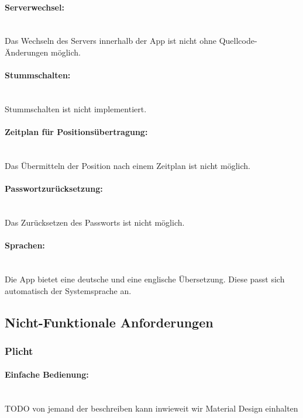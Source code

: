 \documentclass[parskip=full,11pt]{scrartcl}
\begin{document}
\paragraph{\small Serverwechsel:} \hspace{0pt} \\
Das Wechseln des Servers innerhalb der App ist nicht ohne Quellcode-Änderungen
möglich.

\paragraph{\small Stummschalten:} \hspace{0pt} \\
Stummschalten ist nicht implementiert.

\paragraph{\small Zeitplan für Positionsübertragung:} \hspace{0pt} \\
Das Übermitteln der Position nach einem Zeitplan ist nicht möglich.

\paragraph{\small Passwortzurücksetzung:} \hspace{0pt} \\
Das Zurücksetzen des Passworts ist nicht möglich.

\paragraph{\small Sprachen:} \hspace{0pt} \\
Die App bietet eine deutsche und eine englische Übersetzung.
Diese passt sich automatisch der Systemsprache an.

\subsection{Nicht-Funktionale Anforderungen}
\subsubsection{Plicht}
\paragraph{\small Einfache Bedienung:} \hspace{0pt} \\
TODO von jemand der beschreiben kann inwieweit wir Material Design einhalten
\end{document}
